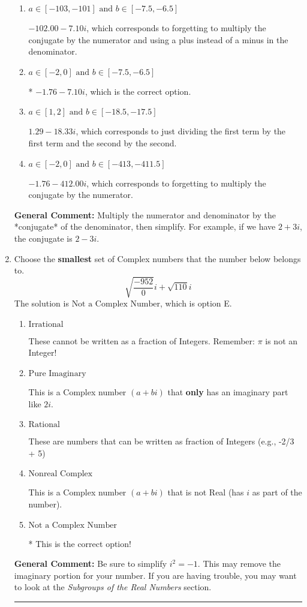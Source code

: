 \documentclass{extbook}[14pt]
\newcommand{\litem}[1]{\item #1

\rule{\textwidth}{0.4pt}}
\begin{document}
\begin{enumerate}
{\begin{enumerate}[label=\Alph*.]
 $3.93  - 6.17 i$, which corresponds to forgetting to multiply the conjugate by the numerator and not computing the conjugate correctly.
\item \( a \in [-103, -101] \text{ and } b \in [-7.5, -6.5] \)

 $-102.00  - 7.10 i$, which corresponds to forgetting to multiply the conjugate by the numerator and using a plus instead of a minus in the denominator.
\item \( a \in [-2, 0] \text{ and } b \in [-7.5, -6.5] \)

* $-1.76  - 7.10 i$, which is the correct option.
\item \( a \in [1, 2] \text{ and } b \in [-18.5, -17.5] \)

 $1.29  - 18.33 i$, which corresponds to just dividing the first term by the first term and the second by the second.
\item \( a \in [-2, 0] \text{ and } b \in [-413, -411.5] \)

 $-1.76  - 412.00 i$, which corresponds to forgetting to multiply the conjugate by the numerator.
\end{enumerate}

\textbf{General Comment:} Multiply the numerator and denominator by the *conjugate* of the denominator, then simplify. For example, if we have $2+3i$, the conjugate is $2-3i$.
}
\litem{
Choose the \textbf{smallest} set of Complex numbers that the number below belongs to.
\[ \sqrt{\frac{-952}{0}} i+\sqrt{110}i \]
The solution is \( \text{Not a Complex Number} \), which is option E.\begin{enumerate}[label=\Alph*.]
\item \( \text{Irrational} \)

These cannot be written as a fraction of Integers. Remember: $\pi$ is not an Integer!
\item \( \text{Pure Imaginary} \)

This is a Complex number $(a+bi)$ that \textbf{only} has an imaginary part like $2i$.
\item \( \text{Rational} \)

These are numbers that can be written as fraction of Integers (e.g., -2/3 + 5)
\item \( \text{Nonreal Complex} \)

This is a Complex number $(a+bi)$ that is not Real (has $i$ as part of the number).
\item \( \text{Not a Complex Number} \)

* This is the correct option!
\end{enumerate}

\textbf{General Comment:} Be sure to simplify $i^2 = -1$. This may remove the imaginary portion for your number. If you are having trouble, you may want to look at the \textit{Subgroups of the Real Numbers} section.
}
\end{enumerate}
\end{document}
